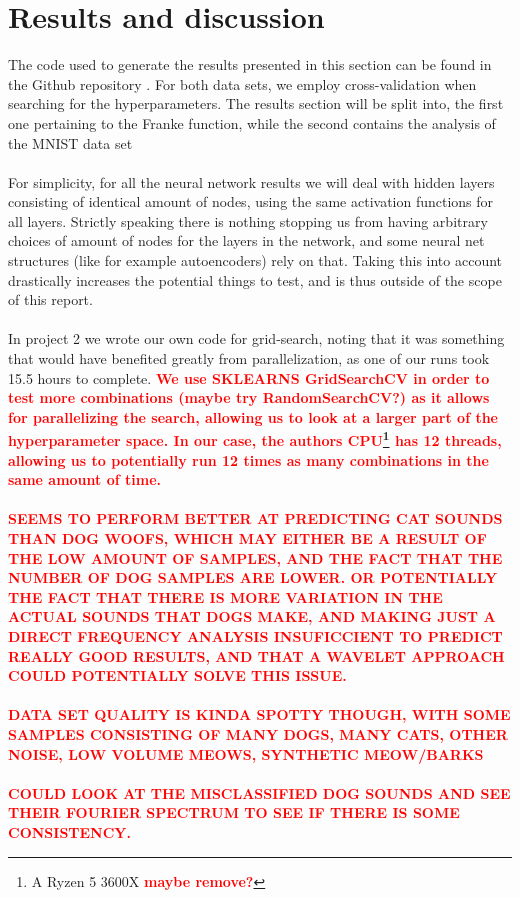 \documentclass[a4paper]{article}
\newcommand\red[1]{\textcolor{red}{\textbf{#1}}}
\begin{document}
\section{Results and discussion} \label{chap:results}
The code used to generate the results presented in this section can be found in the Github repository \cite{Github2}. For both data sets, we employ cross-validation when searching for the hyperparameters. The results section will be split into, the first one pertaining to the Franke function, while the second contains the analysis of the MNIST data set
\\\\
For simplicity, for all the neural network results we will deal with hidden layers consisting of identical amount of nodes, using the same activation functions for all layers. Strictly speaking there is nothing stopping us from having arbitrary choices of amount of nodes for the layers in the network, and some neural net structures (like for example autoencoders) rely on that. Taking this into account drastically increases the potential things to test, and is thus outside of the scope of this report.
\\\\
In project 2 \cite{Github2} we wrote our own code for grid-search, noting that it was something that would have benefited greatly from parallelization, as one of our runs took 15.5 hours to complete.
\red{We use SKLEARNS GridSearchCV in order to test more combinations (maybe try RandomSearchCV?) as it allows for parallelizing the search, allowing us to look at a larger part of the hyperparameter space. In our case, the authors CPU\footnote{A Ryzen 5 3600X \red{maybe remove?}} has 12 threads, allowing us to potentially run 12 times as many combinations in the same amount of time.}
\\\\
\red{SEEMS TO PERFORM BETTER AT PREDICTING CAT SOUNDS THAN DOG WOOFS, WHICH MAY EITHER BE A RESULT OF THE LOW AMOUNT OF SAMPLES, AND THE FACT THAT THE NUMBER OF DOG SAMPLES ARE LOWER. OR POTENTIALLY THE FACT THAT THERE IS MORE VARIATION IN THE ACTUAL SOUNDS THAT DOGS MAKE, AND MAKING JUST A DIRECT FREQUENCY ANALYSIS INSUFICCIENT TO PREDICT REALLY GOOD RESULTS, AND THAT A WAVELET APPROACH COULD POTENTIALLY SOLVE THIS ISSUE.}
\\\\
\red{DATA SET QUALITY IS KINDA SPOTTY THOUGH, WITH SOME SAMPLES CONSISTING OF MANY DOGS, MANY CATS, OTHER NOISE, LOW VOLUME MEOWS, SYNTHETIC MEOW/BARKS}
\\\\
\red{COULD LOOK AT THE MISCLASSIFIED DOG SOUNDS AND SEE THEIR FOURIER SPECTRUM TO SEE IF THERE IS SOME CONSISTENCY.}
\end{document}
